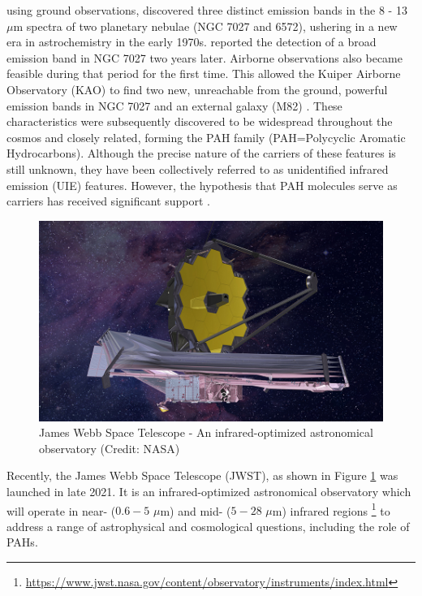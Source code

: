 \citet{gillett_8_1973} using ground observations, discovered three distinct emission bands in the 8 - 13 $\mu$m spectra of two planetary nebulae (NGC 7027 and 6572), ushering in a new era in astrochemistry in the early 1970s. \citet{merrill_2_1975} reported the detection of a broad emission band in NGC 7027 two years later. Airborne observations also became feasible during that period for the first time. This allowed the Kuiper Airborne Observatory (KAO) to find two new, unreachable from the ground, powerful emission bands in NGC 7027 and an external galaxy (M82) \cite{russell_4_1977, willner_2_1977}. These characteristics were subsequently discovered to be widespread throughout the cosmos and closely related, forming the PAH family (PAH=Polycyclic Aromatic Hydrocarbons). Although the precise nature of the carriers of these features is still unknown, they have been collectively referred to as unidentified infrared emission (UIE) features. However, the hypothesis that PAH molecules serve as carriers has received significant support \cite{leger_identification_1984, allamandola_polycyclic_1985}.

\begin{figure}[!htb]
    \centering
    \includegraphics[scale=0.3]{figures/intro/JWST.jpg}
    \caption{James Webb Space Telescope - An infrared-optimized astronomical observatory (Credit: NASA)}
    \label{fig:JWST}
\end{figure}

Recently, the James Webb Space Telescope (JWST), as shown in Figure \ref{fig:JWST} was launched in late 2021. It is an infrared-optimized astronomical observatory which will operate in near- ($0.6 - 5$ $\mu$m) and mid- ($5 - 28$ $\mu$m) infrared regions \footnote{\url{https://www.jwst.nasa.gov/content/observatory/instruments/index.html}} to address a range of astrophysical and cosmological questions, including the role of PAHs.

